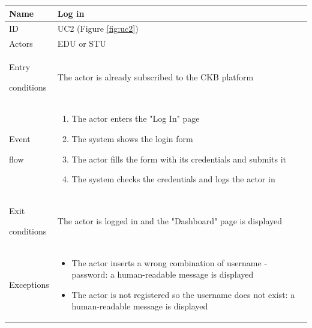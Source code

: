 \begin{center}
    \def\arraystretch{1.5}
    \begin{tabular}{| m{2cm} | m{10cm}|}
        \hline
        Name                  & Log in                                                                                                   \\ \hline
        ID                    & UC2 (Figure \ref{fig:uc2})                                                                               \\ \hline
        Actors                & EDU or STU                                                                                               \\ \hline
        Entry \par conditions & The actor is already subscribed to the CKB platform                                                      \\ \hline
        Event \par flow       & \begin{enumerate}
                                    \item The actor enters the "Log In" page
                                    \item The system shows the login form
                                    \item The actor fills the form with its credentials and submits it
                                    \item The system checks the credentials and logs the actor in
                                \end{enumerate}                                        \\ \hline
        Exit \par conditions  & The actor is logged in and the "Dashboard" page is displayed                                             \\ \hline
        Exceptions            & \begin{itemize}
                                    \item The actor inserts a wrong combination of username - password: a human-readable message is displayed
                                    \item The actor is not registered so the username does not exist: a human-readable message is displayed
                                \end{itemize} \\ \hline
    \end{tabular}
\end{center}

